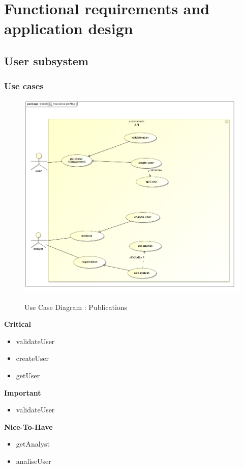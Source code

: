 \documentclass{article}
\begin{document}
\section{Functional requirements and application design}
	\subsection{User subsystem}
		\subsubsection{Use cases}

		\begin{figure}[H]
		\includegraphics[width=\textwidth]{images/uc__Insurance_profiling.jpg}  \\
		\caption{Use Case Diagram : Publications}
		\end{figure}

		\begin{flushleft}
			\textbf{Critical}
				\begin{itemize}
	  				\item validateUser
	  				\item createUser
	  				\item getUser
				\end{itemize}
			\textbf{Important}
				\begin{itemize}
	  				\item validateUser
				\end{itemize}

			\textbf{Nice-To-Have}
				\begin{itemize}
	  				\item getAnalyst
	  				\item analiseUser
				\end{itemize}
		\end{flushleft}
\end{document}

